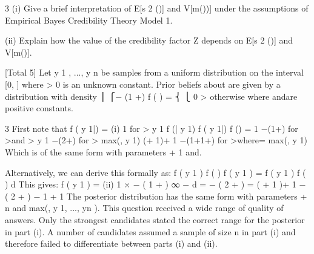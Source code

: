 \documentclass[a4paper,12pt]{article}
\begin{document}
3
(i) Give a brief interpretation of E[s 2 (\theta )] and V[m(\theta ))] under the assumptions of
Empirical Bayes Credibility Theory Model 1.

(ii) Explain how the value of the credibility factor Z depends on E[s 2 (\theta )] and
V[m(\theta )].

[Total 5]
Let y 1 , ..., y n be samples from a uniform distribution on the interval [0, \theta ] where \theta  > 0
is an unknown constant. Prior beliefs about \theta  are given by a distribution with density
⎪ ⎧\alpha\beta \alpha  \theta  − (1 +\alpha  )
f ( \theta  ) = ⎨
⎩ 0
\theta >\beta 
otherwise
where \alpha  and\beta are positive constants.


3
First note that f ( y 1|\theta ) =
(i)
1
for \theta  > y 1
\theta 
f (\theta | y 1) \propto  f ( y 1|\theta ) f (\theta )
=
1
\alpha \beta \alpha  \theta −(1+\alpha ) for \theta  >\beta and \theta  > y 1
\theta 
\propto  \theta −(2+\alpha ) for \theta  > max(\beta , y 1)
\propto  (\alpha  + 1)\beta \alpha + 1 \theta −(1+1+\alpha ) for \theta  >\beta where\beta = max(\beta , y 1)
Which is of the same form with parameters \alpha  + 1 and\beta .

Alternatively, we can derive this formally as:
f ( y 1 \theta  ) f ( \theta  )
f ( \theta  y 1 ) =
\int  f ( y 1 \theta  ) f ( \theta  ) d \theta 
\theta 
This gives:
f ( \theta  y 1 ) =
(ii)
1
\theta 
× \alpha\beta \alpha  \theta  − ( 1 + \alpha  )
∞
\int \beta \alpha \beta 
\alpha 
\theta  − \alpha  d \theta 
=
\alpha\beta \alpha  \theta  − ( 2 + \alpha  )
= ( \alpha  + 1 )\beta \alpha  + 1 \theta  − ( 2 + \alpha  )
− 1
\alpha 
\alpha  + 1 \beta 
The posterior distribution has the same form with parameters \alpha  + n and
max(\beta , y 1, ..., yn ).
This question received a wide range of quality of answers. Only the strongest
candidates stated the correct range for the posterior in part (i). A number of
candidates assumed a sample of size n in part (i) and therefore failed to differentiate
between parts (i) and (ii).
\end{document}
